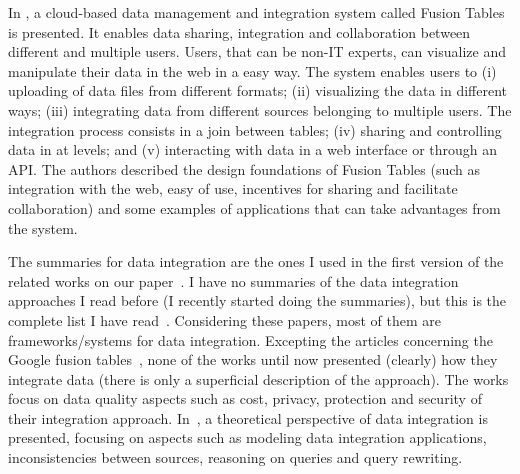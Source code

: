 \documentclass[12pt,a4paper,oneside]{article}
\begin{document}
In \cite{Gonzalez:2010b}, a cloud-based data management and integration system called Fusion Tables is presented. It enables data sharing, integration and collaboration between different and multiple users. Users, that can be non-IT experts, can visualize and manipulate their data in the web in a easy way. The system enables users to (i) uploading of data files from different formats; (ii) visualizing the data in different ways; (iii) integrating data from different sources belonging to multiple users. The integration process consists in a join between tables; (iv) sharing and controlling data in at levels; and (v) interacting with data in a web interface or through an API. The authors described the design foundations of Fusion Tables (such as integration with the web, easy of use, incentives for sharing and facilitate collaboration) and some examples of applications that can take advantages from the system. 

The summaries for data integration are the ones I used in the first version of the related works on our paper~\cite{075,078,Nie07,096,Yau08}. I have no summaries of the data integration approaches I read before (I recently started doing the summaries), but this is the complete list I have read~\cite{066,067,070,072,113,077,Dustdar:2012,081,110,111,094,099,102}. Considering these papers, most of them are frameworks/systems for data integration. Excepting the articles concerning the Google fusion tables~\cite{Gonzalez:2010}, none of the works until now presented (clearly) how they integrate data (there is only a superficial description of the approach). The works focus on data quality aspects such as cost, privacy, protection and security of their integration approach. In~\cite{Lenzerini:2002}, a theoretical perspective of data integration is presented, focusing on aspects such as modeling data integration applications, inconsistencies between sources, reasoning on queries and query rewriting.



\end{document}
